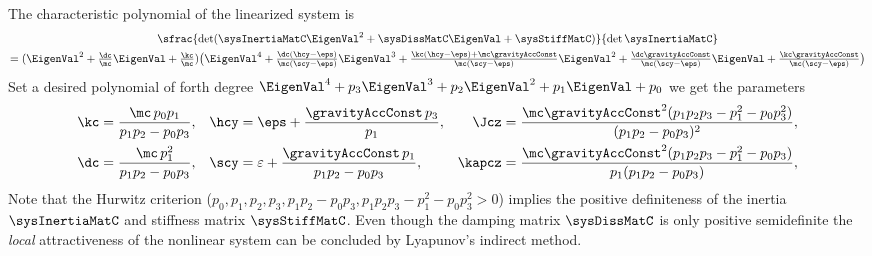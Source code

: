 The characteristic polynomial of the linearized system is
\begin{multline}
 \sfrac{\det(\sysInertiaMatC \EigenVal^2 + \sysDissMatC \EigenVal + \sysStiffMatC)}{\det\sysInertiaMatC}
\\
 = (\EigenVal^2 + \tfrac{\dc}{\mc} \EigenVal + \tfrac{\kc}{\mc})
 \big(\EigenVal^4
 + \tfrac{\dc(\hcy-\eps)}{\mc(\scy-\eps)} \EigenVal^3
 + \tfrac{\kc(\hcy-\eps) + \mc \gravityAccConst}{\mc(\scy-\eps)} \EigenVal^2
 + \tfrac{\dc \gravityAccConst}{\mc (\scy-\eps)} \EigenVal
 + \tfrac{\kc \gravityAccConst}{\mc (\scy-\eps)} \big)
\end{multline}
Set a desired polynomial of forth degree $\EigenVal^4 + p_3 \EigenVal^3 + p_2 \EigenVal^2 + p_1 \EigenVal + p_0$ we get the parameters
\begin{align}
 \kc &= \frac{\mc \, p_0 p_1}{p_1 p_2 - p_0 p_3},&
 \hcy &= \eps + \frac{\gravityAccConst\, p_3}{p_1},&
 \Jcz &= \frac{\mc \gravityAccConst^2 (p_1 p_2 p_3 - p_1^2 - p_0 p_3^2)}{(p_1 p_2 - p_0 p_3)^2},
\\
 \dc &= \frac{\mc\, p_1^2}{p_1 p_2 - p_0 p_3},&
 \scy &= \varepsilon + \frac{\gravityAccConst\, p_1}{p_1 p_2 - p_0 p_3},&
 \kapcz &= \frac{\mc \gravityAccConst^2 (p_1 p_2 p_3 - p_1^2 - p_0 p_3)}{p_1 (p_1 p_2 - p_0 p_3)},
\end{align}
Note that the Hurwitz criterion ($p_0, p_1, p_2, p_3, p_1 p_2 - p_0 p_3, p_1 p_2 p_3 - p_1^2 - p_0 p_3^2 > 0$) implies the positive definiteness of the inertia $\sysInertiaMatC$ and stiffness matrix $\sysStiffMatC$.
Even though the damping matrix $\sysDissMatC$ is only positive semidefinite the \textit{local} attractiveness of the nonlinear system can be concluded by Lyapunov's indirect method.

